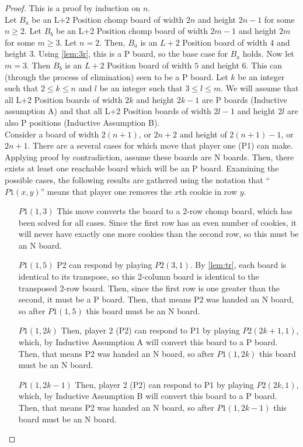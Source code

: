 \documentclass{amsart}
\theoremstyle{definition}
\theoremstyle{remark}
\numberwithin{equation}{section}
\begin{document}
\begin{proof}
This is a proof by induction on $n$.\\
Let $B_a$ be an L+2 Position chomp board of width $2n$ and height $2n-1$ for some $n \geq 2$.  Let $B_b$ be an L+2 Position chomp board of width $2m-1$ and height $2m$ for some $m \geq 3$.  Let $n = 2$.  Then, $B_a$ is an $L+2$ Position board of width $4$ and height $3$.  Using \ref{lem:3r}, this is a P board, so the base case for $B_a$ holds.  Now let $m = 3$.  Then $B_b$ is an $L+2$ Position board of width $5$ and height $6$.  This can (through the process of elimination) seen to be a P board.  Let $k$ be an integer such that $2 \leq k \leq n$ and $l$ be an integer such that $3 \leq l \leq m$.  We will assume that all L+2 Position boards of width $2k$ and height $2k-1$ are P boards (Inductive assumption A) and that all L+2 Position boards of width $2l-1$ and height $2l$ are also P positions (Inductive Assumption B).\\
Consider a board of width $2(n+1)$, or $2n+2$ and height of $2(n+1)-1$, or $2n + 1$.  There are a several cases for which move that player one (P1) can make.  Applying proof by contradiction, assume these boards are N boards.  Then, there exists at least one reachable board which will be an P board.  Examining the possible cases, the following results are gathered using the  notation that ``$P1(x,y)$'' means that player one removes the $x$th cookie in row $y$.
\begin{itemize}
	\item [$P1(1, 3)$] This move converts the board to a 2-row chomp board, which has been solved for all cases.  Since the first row has an even number of cookies, it will never have exactly one more cookies than the second row, so this must be an N board.
	\item [$P1(1,5)$] P2 can respond by playing $P2(3,1)$. By \ref{lem:tr}, each board is identical to its transpose, so this 2-column board is identical to the transposed 2-row board.  Then, since the first row is one greater than the second, it must be a P board.  Then, that means P2 was handed an N board, so after $P1(1,5)$ this board must be an N board.
	\item [$P1(1, 2k)$] Then, player 2 (P2) can respond to P1 by playing $P2(2k+1,1)$, which, by Inductive Assumption A will convert this board to a P board.  Then, that means P2 was handed an N board, so after $P1(1,2k)$ this board must be an N board.
	\item [$P1(1, 2k-1)$] Then, player 2 (P2) can respond to P1 by playing $P2(2k,1)$, which, by Inductive Assumption B will convert this board to a P board.  Then, that means P2 was handed an N board, so after $P1(1,2k-1)$ this board must be an N board.

\end{itemize}
\end{proof}
\end{document}
